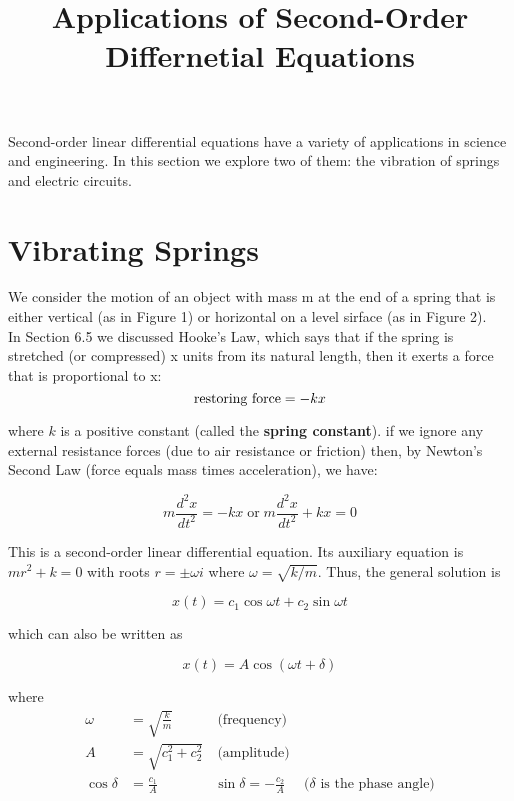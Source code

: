 \documentclass[12pt]{article}
\title{Applications of Second-Order Differnetial Equations}
\begin{document}
  
  \maketitle

  Second-order linear differential equations have a variety of applications in science and
  engineering. In this section we explore two of them: the vibration of springs and
  electric circuits. \\

  \section{Vibrating Springs}
    We consider the motion of an object with mass m at the end of a spring that is either
    vertical (as in Figure 1) or horizontal on a level sirface (as in Figure 2). \\
    \; In Section 6.5 we discussed Hooke's Law, which says that if the spring is stretched (or
        compressed) x units from its natural length, then it exerts a force that is
    proportional to x:\\

    $$ \text{restoring force} = -kx \\ $$

    where $k$ is a positive constant (called the \textbf{spring constant}). if we ignore any
    external resistance forces (due to air resistance or friction) then, by Newton's Second
    Law (force equals mass times acceleration), we have: 

    \begin{equation}
      m\frac{d^2x}{dt^2} = -kx \; \text{or} \; m\frac{d^2x}{dt^2} + kx = 0 
    \end{equation}

    This is a second-order linear differential equation. Its auxiliary equation is $mr^2
    + k = 0$ with roots $r = \pm\omega i$ where $\omega = \sqrt{k/m}$. Thus, the general
    solution is 

      \begin{equation*}
        x(t) = c_1 \cos\omega t + c_2\sin\omega t
      \end{equation*}

      which can also be written as 

      \begin{equation*}
        x(t) = A\cos(\omega t + \delta)
      \end{equation*}

      where 
      \begin{align*}
        \omega &= \sqrt{\frac{k}{m}} & \: \text{(frequency)} \\
        A &= \sqrt{c_1^2 + c_2^2} & \: \text{(amplitude)} \\
        \cos\delta &= \frac{c_1}{A} & \sin\delta = -\frac{c_2}{A} & \: \text{($\delta$ is the phase angle)}
      \end{align*}
\end{document}
